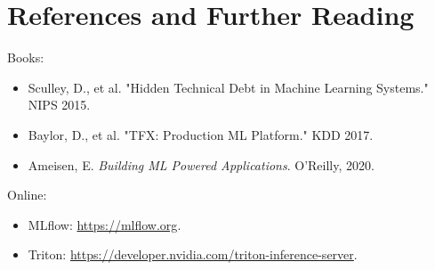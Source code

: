 \documentclass[11pt]{article}
\begin{document}
\section{References and Further Reading}
Books:
\begin{itemize}
    \item Sculley, D., et al. "Hidden Technical Debt in Machine Learning Systems." NIPS 2015.
    \item Baylor, D., et al. "TFX: Production ML Platform." KDD 2017.
    \item Ameisen, E. \textit{Building ML Powered Applications}. O'Reilly, 2020.
\end{itemize}

Online:
\begin{itemize}
    \item MLflow: \url{https://mlflow.org}.
    \item Triton: \url{https://developer.nvidia.com/triton-inference-server}.
\end{itemize}
\end{document}
